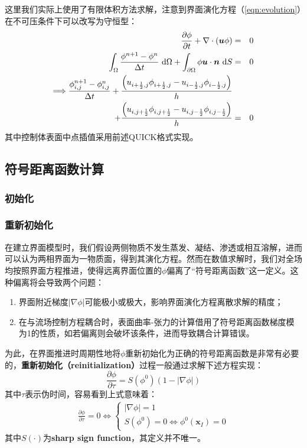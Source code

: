 \documentclass[11pt]{article}
\begin{document}
这里我们实际上使用了有限体积方法求解，注意到界面演化方程（\autoref{eqn:evolution}）在不可压条件下可以改写为守恒型：
\begin{eqnarray}
    \frac{\partial \phi}{\partial t}+\nabla\cdot\left(\bm{u}\phi\right)&=&0 \\
    \int_\Omega \frac{\phi^{n+1}-\phi^n}{\Delta t}\ \mathrm{d}\Omega+\int_{\partial\Omega}\phi\bm{u}\cdot\bm{n}\ \mathrm{d}S&=&0 \\
    \Longrightarrow \frac{\phi^{n+1}_{i,j}-\phi^n_{i,j}}{\Delta t}+\frac{\left(u_{i+\frac{1}{2},j}\phi_{i+\frac{1}{2},j}-u_{i-\frac{1}{2},j}\phi_{i-\frac{1}{2},j}\right)}{h} & & \notag\\+\frac{\left(u_{i,j +\frac{1}{2}}\phi_{i,j+\frac{1}{2}}-u_{i,j-\frac{1}{2}}\phi_{i,j-\frac{1}{2}}\right)}{h}&=&0
\end{eqnarray}
其中控制体表面中点插值采用前述QUICK格式实现。

\subsection{符号距离函数计算}
\subsubsection{初始化}

\subsubsection{重新初始化}
在建立界面模型时，我们假设两侧物质不发生蒸发、凝结、渗透或相互溶解，进而可以认为两相界面为一物质面，得到其演化方程。然而在数值求解时，我们对全场均按照界面方程推进，使得远离界面位置的$\phi$偏离了“符号距离函数”这一定义。这种偏离将会导致两个问题\citep{prosperetti_computational_2009}：
\begin{enumerate}
    \item 界面附近梯度$|\nabla\phi|$可能极小或极大，影响界面演化方程离散求解的精度；
    \item 在与流场控制方程耦合时，表面曲率-张力的计算借用了符号距离函数梯度模为1的性质，如若偏离则会破坏该条件，进而导致耦合计算错误。
\end{enumerate}
为此，在界面推进时周期性地将$\phi$重新初始化为正确的符号距离函数是非常有必要的，\textbf{重新初始化（reinitialization）}过程一般通过求解下述方程实现：
\begin{equation}
    \frac{\partial \phi}{\partial \tau}=S(\phi^0)\left(1-|\nabla\phi|\right)
    \label{eqn:reinit}
\end{equation}
其中$\tau$表示伪时间，容易看到上式意味着：
\begin{eqnarray}
    \frac{\partial \phi}{\partial \tau}=0\Longleftrightarrow\left\{\begin{array}{l}
        |\nabla\phi|=1 \\
        S(\phi^0)=0\Longleftrightarrow\phi^0(\bm{x}_I)=0
    \end{array}\right.
\end{eqnarray}
其中$S(\cdot)$为\textbf{sharp sign function}，其定义并不唯一。
\end{document}
